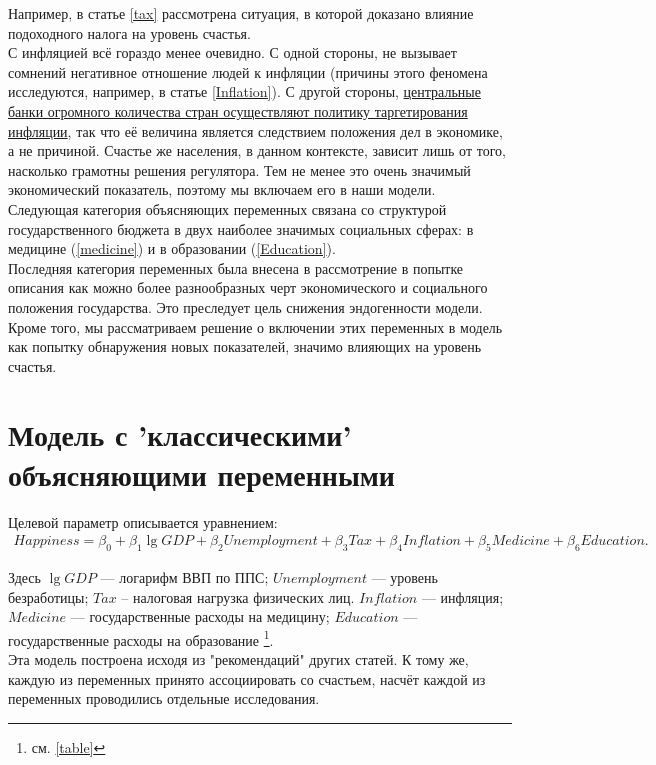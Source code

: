\documentclass[russian]{vegareport}
\begin{document}
        Например, в статье \ref{tax} рассмотрена ситуация, в которой доказано влияние подоходного налога на уровень счастья.
        \\
        С инфляцией всё гораздо менее очевидно. С одной стороны, не вызывает сомнений негативное отношение людей к инфляции 
        (причины этого феномена исследуются, например, в статье \ref{Inflation}). С другой стороны, 
        \href{http://www.centralbanknews.info/p/inflation-targets.html}{центральные банки огромного количества стран осуществляют политику таргетирования инфляции}, 
        так что её величина является следствием положения дел в экономике, а не причиной. 
        Счастье же населения, в данном контексте, зависит лишь от того, насколько грамотны решения регулятора. 
        Тем не менее это очень значимый экономический показатель, поэтому мы включаем его в наши модели.
        \\
        Следующая категория объясняющих переменных связана со структурой государственного бюджета 
        в двух наиболее значимых социальных сферах: в медицине (\ref{medicine}) и в образовании (\ref{Education}).
        \\
        Последняя категория переменных была внесена в рассмотрение в попытке описания как можно 
        более разнообразных черт экономического и социального положения государства. 
        Это преследует цель снижения эндогенности модели. Кроме того, мы рассматриваем решение о 
        включении этих переменных в модель как попытку обнаружения новых показателей, значимо влияющих на уровень счастья.

        \section{Модель с 'классическими' объясняющими переменными}
        Целевой параметр описывается уравнением:
        \begin{align*}
        Happiness = \beta_0 + \beta_1 \lg{GDP} + \beta_2 Unemployment + \beta_3 Tax + \beta_4 Inflation + \beta_5 Medicine + \beta_6 Education.
        \end{align*}

        Здесь $\lg{GDP}$ --- логарифм ВВП по ППС; $Unemployment$ --- уровень безработицы; $Tax$ -- налоговая нагрузка физических лиц. $Inflation$ --- инфляция; $Medicine$ --- государственные расходы на медицину; $Education$ --- государственные расходы на образование \footnote{см. \ref{table}}.
        \\
        Эта модель построена исходя из "рекомендаций" других статей. К тому же, каждую из переменных принято ассоциировать со счастьем, насчёт каждой из переменных проводились отдельные исследования.
\end{document}
